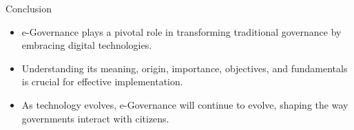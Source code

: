 \begin{frame}{Conclusion}
  \begin{itemize}
    \item e-Governance plays a pivotal role in transforming traditional governance by embracing digital technologies.
    \item Understanding its meaning, origin, importance, objectives, and fundamentals is crucial for effective implementation.
    \item As technology evolves, e-Governance will continue to evolve, shaping the way governments interact with citizens.
  \end{itemize}
\end{frame}
